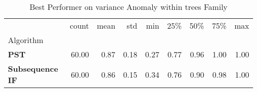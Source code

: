 \begin{table}
\caption{Best Performer on variance Anomaly within trees Family}
\label{tab:bp-variance_trees}
\begin{tabular}{lrrrrrrrr}
\toprule
 & count & mean & std & min & 25\% & 50\% & 75\% & max \\
Algorithm &  &  &  &  &  &  &  &  \\
\midrule
\textbf{PST} & 60.00 & 0.87 & 0.18 & 0.27 & 0.77 & 0.96 & 1.00 & 1.00 \\
\textbf{Subsequence IF} & 60.00 & 0.86 & 0.15 & 0.34 & 0.76 & 0.90 & 0.98 & 1.00 \\
\bottomrule
\end{tabular}
\end{table}
